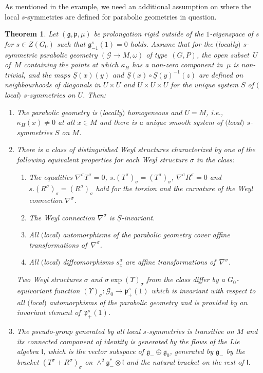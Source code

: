 \documentclass[pdftex]{sigma}
\newcommand{\om}{\omega}
\newcommand{\si}{\sigma}
\newcommand{\un}{\underline}
\newcommand{\ba}{\mathcal{G}}
\newcommand{\fg}{\mathfrak g}
\newcommand{\fp}{\mathfrak p}
\newcommand{\fl}{\mathfrak l}
\newcommand{\U}{\Upsilon}
\numberwithin{equation}{section}
\newtheorem{Theorem}{Theorem}[section]
\begin{document}
As mentioned in the example, we need an additional assumption on where the local $s$-symmetries are def\/ined for parabolic geometries in question.

\begin{Theorem} \label{6.4}
Let $(\fg,\fp,\mu)$ be prolongation rigid outside of the $1$-eigenspace of $s$ for $s\in Z(G_0)$ such that $\fg_{-1}^s(1)=0$ holds. Assume that for the $($locally$)$ $s$-symmetric parabolic geometry $(\ba\to M,\om)$ of type~$(G,P)$, the open subset~$U$ of~$M$ containing the points at which $\kappa_H$ has a non-zero component in~$\mu$ is non-trivial, and the maps $\un S(x)(y)$ and $\un S(x)\circ \un S(y)^{-1}(z)$ are defined on neighbourhoods of diagonals in $U\times U$ and $U\times U\times U$ for the unique system $S$ of $($local$)$ $s$-symmetries on $U$. Then:
\begin{enumerate}\itemsep=0pt
\item[$1.$]
The parabolic geometry is $($locally$)$ homogeneous and $U=M$, i.e., $\kappa_H(x)\neq 0$ at all $x\in M$ and there is a unique smooth system of $($local$)$ $s$-symmetries $S$ on $M$.
\item[$2.$] There is a class of distinguished Weyl structures characterized by one of the following equivalent properties for each Weyl structure $\si$ in the class:
\begin{enumerate}\itemsep=0pt
\item[$(a)$] The equalities $\nabla^\si T^\si=0$, $s.(T^\si)_\si=(T^\si)_\si$, $\nabla^\si R^\si=0$ and $s.(R^\si)_\si=(R^\si)_\si$ hold for the torsion and the curvature of the Weyl connection $\nabla^\si$.
\item[$(b)$] The Weyl connection $\nabla^\si$ is $\un S$-invariant.
\item[$(c)$] All $($local$)$ automorphisms of the parabolic geometry cover affine transformations of~$\nabla^\si$.
\item[$(d)$] All $($local$)$ diffeomorphisms $s_x^\si$ are affine transformations of~$\nabla^\si$.
\end{enumerate}
Two Weyl structures $\si$ and $\si\exp(\U)_\si$ from the class differ by a $G_0$-equivariant function $(\U)_\si\colon \ba_0\to \fp_+^s(1)$ which is invariant with respect to all $($local$)$ automorphisms of the parabolic geometry and is provided by an invariant element of~$\fp_+^s(1)$.
\item[$3.$] The pseudo-group generated by all local $s$-symmetries is transitive on $M$ and its connected component of identity is generated by the flows of the Lie algebra $\fl$, which is the vector subspace of $\fg_-\oplus \fg_0$, generated by $\fg_-$ by the bracket $(T^\si+R^\si)_\si$ on $\wedge^2 \fg_-^*\otimes \fl$ and the natural bracket on the rest of $\fl$.

\end{enumerate}
\end{Theorem}
\end{document}
